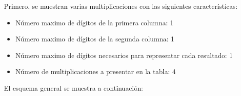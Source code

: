 \documentclass[svgnames,addpoints]{exam}
\newlength{\zerowidth}
\newlength{\zeroheight}
\begin{document}
\begin{questions}

  \question Primero, se muestran varias multiplicaciones con las siguientes
  características:

  \begin{itemize}
    
    \item Número maximo de dígitos de la primera columna: 1
    
    \item Número maximo de dígitos de la segunda columna: 1
    
    \item Número maximo de dígitos necesarios para representar cada resultado: 1

    \item Número de multiplicaciones a presentar en la tabla: 4
    
  \end{itemize}

  El esquema general se muestra a continuación:

  \noindent\begin{minipage}{0.33\linewidth}
    \begin{center}
\end{center}
\end{minipage}
\end{questions}
\end{document}

